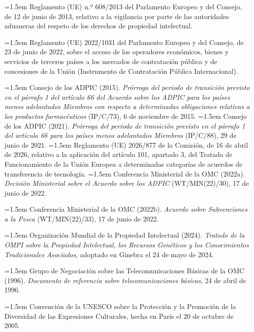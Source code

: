 \documentclass[10pt,a4paper]{article}
\begin{document}
\noindent\hangindent=1.5em Reglamento (UE) n.º 608/2013 del Parlamento Europeo y del Consejo, de 12 de junio de 2013, relativo a la vigilancia por parte de las autoridades aduaneras del respeto de los derechos de propiedad intelectual.

\noindent\hangindent=1.5em Reglamento (UE) 2022/1031 del Parlamento Europeo y del Consejo, de 23 de junio de 2022, sobre el acceso de los operadores económicos, bienes y servicios de terceros países a los mercados de contratación pública y de concesiones de la Unión (Instrumento de Contratación Pública Internacional).

\noindent\hangindent=1.5em Consejo de los ADPIC (2015). \textit{Prórroga del periodo de transición previsto en el párrafo 1 del artículo 66 del Acuerdo sobre los ADPIC para los países menos adelantados Miembros con respecto a determinadas obligaciones relativas a los productos farmacéuticos} (IP/C/73), 6 de noviembre de 2015.
\noindent\hangindent=1.5em Consejo de los ADPIC (2021). \textit{Prórroga del periodo de transición previsto en el párrafo 1 del artículo 66 para los países menos adelantados Miembros} (IP/C/88), 29 de junio de 2021.
\noindent\hangindent=1.5em Reglamento (UE) 2026/877 de la Comisión, de 16 de abril de 2026, relativo a la aplicación del artículo 101, apartado 3, del Tratado de Funcionamiento de la Unión Europea a determinadas categorías de acuerdos de transferencia de tecnología.
\noindent\hangindent=1.5em Conferencia Ministerial de la OMC (2022a). \textit{Decisión Ministerial sobre el Acuerdo sobre los ADPIC} (WT/MIN(22)/30), 17 de junio de 2022.

\noindent\hangindent=1.5em Conferencia Ministerial de la OMC (2022b). \textit{Acuerdo sobre Subvenciones a la Pesca} (WT/MIN(22)/33), 17 de junio de 2022.

\noindent\hangindent=1.5em Organización Mundial de la Propiedad Intelectual (2024). \textit{Tratado de la OMPI sobre la Propiedad Intelectual, los Recursos Genéticos y los Conocimientos Tradicionales Asociados}, adoptado en Ginebra el 24 de mayo de 2024.

\noindent\hangindent=1.5em Grupo de Negociación sobre las Telecomunicaciones Básicas de la OMC (1996). \textit{Documento de referencia sobre telecomunicaciones básicas}, 24 de abril de 1996.

\noindent\hangindent=1.5em Convención de la UNESCO sobre la Protección y la Promoción de la Diversidad de las Expresiones Culturales, hecha en París el 20 de octubre de 2005.
\end{document}

